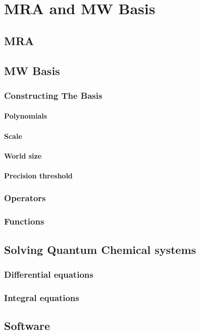 \documentclass[../master_thesis.tex]{subfiles}
\begin{document}
\chapter{\ac{MRA} and \ac{MW} Basis}
\section{\ac{MRA}}
\section{\ac{MW} Basis}
\subsection{Constructing The Basis}
\subsubsection{Polynomials}
\subsubsection{Scale}
\subsubsection{World size}
\subsubsection{Precision threshold}
\subsection{Operators}
\subsection{Functions}
\section{Solving Quantum Chemical systems}
\subsection{Differential equations}
\subsection{Integral equations}
\section{Software}

\biblio
\end{document}
